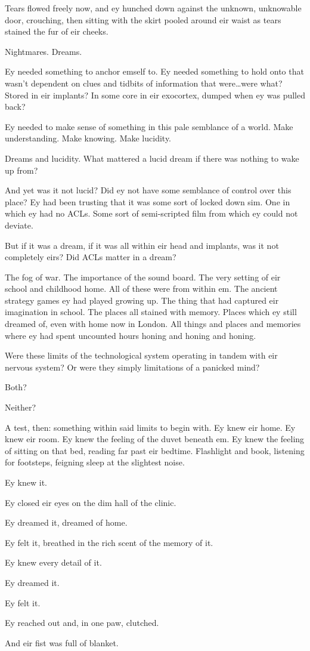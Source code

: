 Tears flowed freely now, and ey hunched down against the unknown, unknowable door, crouching, then sitting with the skirt pooled around eir waist as tears stained the fur of eir cheeks.

Nightmares. Dreams.

Ey needed something to anchor emself to. Ey needed something to hold onto that wasn't dependent on clues and tidbits of information that were\ldots{}were what? Stored in eir implants? In some core in eir exocortex, dumped when ey was pulled back?

Ey needed to make sense of something in this pale semblance of a world. Make understanding. Make knowing. Make lucidity.

Dreams and lucidity. What mattered a lucid dream if there was nothing to wake up from?

And yet was it not lucid? Did ey not have some semblance of control over this place? Ey had been trusting that it was some sort of locked down sim. One in which ey had no ACLs. Some sort of semi-scripted film from which ey could not deviate.

But if it was a dream, if it was all within eir head and implants, was it not completely eirs? Did ACLs matter in a dream?

The fog of war. The importance of the sound board. The very setting of eir school and childhood home. All of these were from within em. The ancient strategy games ey had played growing up. The thing that had captured eir imagination in school. The places all stained with memory. Places which ey still dreamed of, even with home now in London. All things and places and memories where ey had spent uncounted hours honing and honing and honing.

Were these limits of the technological system operating in tandem with eir nervous system? Or were they simply limitations of a panicked mind?

Both?

Neither?

A test, then: something within said limits to begin with. Ey knew eir home. Ey knew eir room. Ey knew the feeling of the duvet beneath em. Ey knew the feeling of sitting on that bed, reading far past eir bedtime. Flashlight and book, listening for footsteps, feigning sleep at the slightest noise.

Ey knew it.

Ey closed eir eyes on the dim hall of the clinic.

Ey dreamed it, dreamed of home.

Ey felt it, breathed in the rich scent of the memory of it.

Ey knew every detail of it.

Ey dreamed it.

Ey felt it.

Ey reached out and, in one paw, clutched.

And eir fist was full of blanket.
